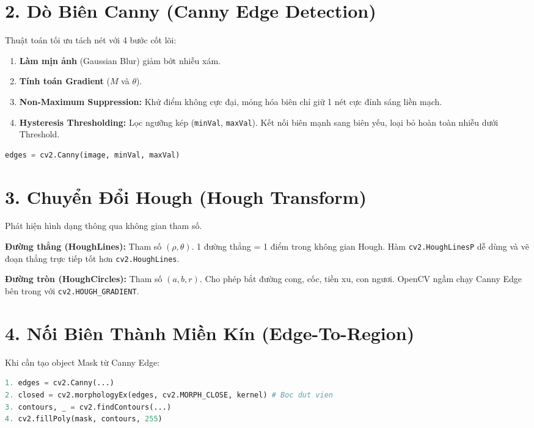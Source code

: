 \documentclass[9pt,landscape,a4paper]{extarticle}
\begin{document}
\begin{multicols*}{3}
\begin{multicols*}{3}
\begin{multicols}{3}
\section{2. Dò Biên Canny (Canny Edge Detection)}
Thuật toán tối ưu tách nét với 4 bước cốt lõi:
\begin{enumerate}
    \item \textbf{Làm mịn ảnh} (Gaussian Blur) giảm bớt nhiễu xám.
    \item \textbf{Tính toán Gradient} ($M$ và $\theta$).
    \item \textbf{Non-Maximum Suppression:} Khử điểm không cực đại, mỏng hóa biên chỉ giữ 1 nét cực đỉnh sáng liền mạch. 
    \item \textbf{Hysteresis Thresholding:} Lọc ngưỡng kép (\texttt{minVal}, \texttt{maxVal}). Kết nối biên mạnh sang biên yếu, loại bỏ hoàn toàn nhiễu dưới Threshold.
\end{enumerate}
\begin{lstlisting}[language=Python]
edges = cv2.Canny(image, minVal, maxVal)
\end{lstlisting}

\section{3. Chuyển Đổi Hough (Hough Transform)}
Phát hiện hình dạng thông qua không gian tham số.
\begin{tipbox}
\textbf{Đường thẳng (HoughLines):} Tham số $(\rho, \theta)$. 1 đường thẳng = 1 điểm trong không gian Hough. Hàm \texttt{cv2.HoughLinesP} dễ dùng và vẽ đoạn thẳng trực tiếp tốt hơn \texttt{cv2.HoughLines}.
\end{tipbox}
\begin{tipbox}
\textbf{Đường tròn (HoughCircles):} Tham số $(a, b, r)$. Cho phép bắt đường cong, cốc, tiền xu, con ngươi. OpenCV ngầm chạy Canny Edge bên trong với \texttt{cv2.HOUGH\_GRADIENT}.
\end{tipbox}

\section{4. Nối Biên Thành Miền Kín (Edge-To-Region)}
Khi cần tạo object Mask từ Canny Edge:
\begin{lstlisting}[language=Python]
1. edges = cv2.Canny(...)
2. closed = cv2.morphologyEx(edges, cv2.MORPH_CLOSE, kernel) # Boc dut vien
3. contours, _ = cv2.findContours(...)
4. cv2.fillPoly(mask, contours, 255)
\end{lstlisting}

\end{multicols}

\end{multicols*}

\end{multicols*}
\end{document}
